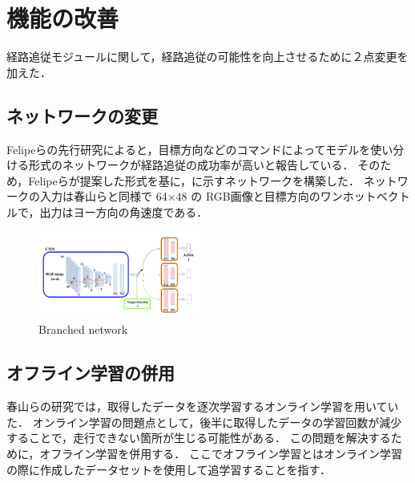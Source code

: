 \documentclass[10pt]{jarticle}
\begin{document}
    \section{機能の改善}%
    経路追従モジュールに関して，経路追従の可能性を向上させるために２点変更を加えた．
    \subsection{ネットワークの変更}
    Felipeらの先行研究\cite{Codevilla2018}によると，目標方向などのコマンドによってモデルを使い分ける形式のネットワークが経路追従の成功率が高いと報告している．
    そのため，Felipeら\cite{Codevilla2018}が提案した形式を基に，に示すネットワークを構築した．
    ネットワークの入力は春山らと同様で 64×48 の RGB画像と目標方向のワンホットベクトルで，出力はヨー方向の角速度である．
    \vspace{-1zh}
    \begin{center}
        \begin{figure}[h]
            \includegraphics[width=0.475\textwidth]{./fig/ishiguro/branched.pdf}
            \vspace{-2zh}
            \caption{Branched network}
            \label{fig:branched}
        \end{figure}
    \end{center}
    \vspace{-3zh}

    \subsection{オフライン学習の併用}
    春山らの研究では，取得したデータを逐次学習するオンライン学習を用いていた．
    オンライン学習の問題点として，後半に取得したデータの学習回数が減少することで，走行できない箇所が生じる可能性がある．
    この問題を解決するために，オフライン学習を併用する．
    ここでオフライン学習とはオンライン学習の際に作成したデータセットを使用して追学習することを指す．
\end{document}
